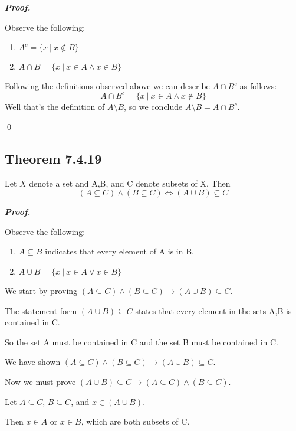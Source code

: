 \documentclass{article}
\begin{document}
\textbf{\textit{Proof.}}

Observe the following:
\begin{enumerate}
	\item $A^c = \{x\ |\ x \not\in B \}$
	\item $A \cap B = \{x\ |\ x \in A \land x \in B \}$
\end{enumerate}

Following the definitions observed above we can describe $A \cap B^c$ as follows:
\begin{equation}
	A \cap B^c = \{x\ |\ x \in A \land x \not\in B \}
\end{equation}
Well that's the definition of $A \setminus B$, so we conclude $A \setminus B = A \cap B^c$.

\qed



\pagebreak
\subsection{Theorem 7.4.19}
Let $X$ denote a set and A,B, and C denote subsets of X. Then
\begin{equation}
	(A \subseteq C) \land (B \subseteq C) \iff (A \cup B) \subseteq C
\end{equation}

\textbf{\textit{Proof.}}

Observe the following:
\begin{enumerate}
	\item $A \subseteq B$ indicates that every element of A is in B.
	\item $A \cup B = \{x\ |\ x \in A \lor x \in B \}$
\end{enumerate}

We start by proving $(A \subseteq C) \land (B \subseteq C) \rightarrow (A \cup B) \subseteq C$.

The statement form $(A \cup B) \subseteq C$ states that every element in the sets A,B is contained in C.

So the set A must be contained in C and the set B must be contained in C.

We have shown $(A \subseteq C) \land (B \subseteq C) \rightarrow (A \cup B) \subseteq C$.

Now we must prove $(A \cup B) \subseteq C \rightarrow (A \subseteq C) \land (B \subseteq C)$.

Let $A \subseteq C$, $B \subseteq C$, and $x \in (A \cup B)$. 

Then $x \in A$ or $x \in B$, which are both subsets of C.
\end{document}
